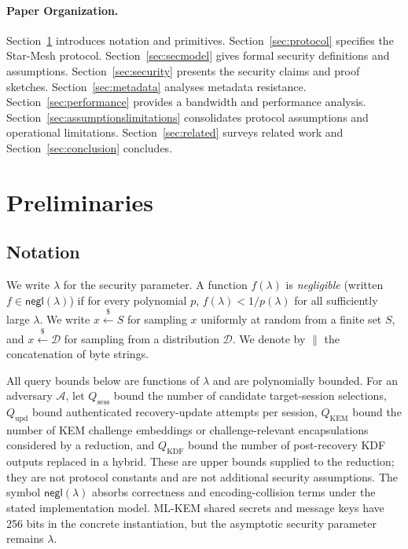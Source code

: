 \documentclass[11pt,a4paper]{article}
\theoremstyle{remark}
\theoremstyle{plain}
\newcommand{\negl}{\mathsf{negl}}
\newcommand{\getsr}{\stackrel{\$}{\leftarrow}}
\begin{document}
\paragraph{Paper Organization.}
Section~\ref{sec:prelim} introduces notation and primitives.
Section~\ref{sec:protocol} specifies the Star-Mesh protocol.
Section~\ref{sec:secmodel} gives formal security definitions and assumptions.
Section~\ref{sec:security} presents the security claims and proof sketches.
Section~\ref{sec:metadata} analyses metadata resistance.
Section~\ref{sec:performance} provides a bandwidth and performance analysis.
Section~\ref{sec:assumptionslimitations} consolidates protocol assumptions and operational limitations.
Section~\ref{sec:related} surveys related work and Section~\ref{sec:conclusion} concludes.

\section{Preliminaries}
\label{sec:prelim}

\subsection{Notation}

We write $\lambda$ for the security parameter.  A function $f(\lambda)$ is \emph{negligible}
(written $f \in \negl(\lambda)$) if for every polynomial $p$, $f(\lambda) < 1/p(\lambda)$ for
all sufficiently large $\lambda$.  We write $x \getsr S$ for sampling $x$ uniformly at random
from a finite set $S$, and $x \getsr \mathcal{D}$ for sampling from a distribution
$\mathcal{D}$.  We denote by $\|$ the concatenation of byte strings.

All query bounds below are functions of $\lambda$ and are polynomially bounded.  For an
adversary $\mathcal A$, let $Q_{\mathrm{sess}}$ bound the number of candidate target-session
selections, $Q_{\mathrm{upd}}$ bound authenticated recovery-update attempts per session,
$Q_{\mathrm{KEM}}$ bound the number of KEM challenge embeddings or challenge-relevant
encapsulations considered by a reduction, and $Q_{\mathrm{KDF}}$ bound the number of
post-recovery KDF outputs replaced in a hybrid.  These are upper bounds supplied to the
reduction; they are not protocol constants and are not additional security assumptions.  The
symbol $\negl(\lambda)$ absorbs correctness and encoding-collision terms under the stated
implementation model.  ML-KEM shared secrets and message keys have 256 bits in the concrete
instantiation, but the asymptotic security parameter remains $\lambda$.
\end{document}
